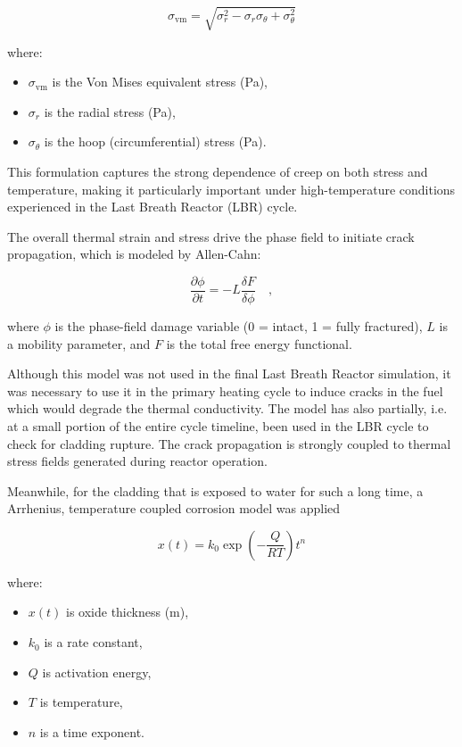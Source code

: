 \begin{equation}
    \sigma_{\text{vm}} = \sqrt{\sigma_r^2 - \sigma_r \sigma_\theta + \sigma_\theta^2}
\end{equation}

where:
\begin{itemize}
	\item $\sigma_{\text{vm}}$ is the Von Mises equivalent stress (Pa),
	\item $\sigma_r$ is the radial stress (Pa),
	\item $\sigma_\theta$ is the hoop (circumferential) stress (Pa).
\end{itemize}

This formulation captures the strong dependence of creep on both stress and temperature, making it particularly important under high-temperature conditions experienced in the Last Breath Reactor (LBR) cycle.

The overall thermal strain and stress drive the phase field to initiate crack propagation, which is modeled by Allen-Cahn:

\begin{equation}
    \frac{\partial\phi}{\partial t}=-L\frac{\delta F}{\delta\phi}\quad,
\end{equation}

where $\phi$ is the phase-field damage variable (0 = intact, 1 = fully fractured), $L$ is a mobility parameter, and $F$ is the total free energy functional.

Although this model was not used in the final Last Breath Reactor simulation, it was necessary to use it in the primary heating cycle to induce cracks in the fuel which would degrade the thermal conductivity. The model has also partially, i.e. at a small portion of the entire cycle timeline, been used in the LBR cycle to check for cladding rupture. The crack propagation is strongly coupled to thermal stress fields generated during reactor operation.

Meanwhile, for the cladding that is exposed to water for such a long time, a Arrhenius, temperature coupled corrosion model was applied

\begin{equation}
    x\left(t\right)=k_0\exp{\left(-\frac{Q}{RT}\right)}t^n
\end{equation}

where:
\begin{itemize}
	\item $x(t)$ is oxide thickness (m),
	\item $k_0$ is a rate constant,
	\item $Q$ is activation energy,
	\item $T$ is temperature,
	\item $n$ is a time exponent.
\end{itemize}

